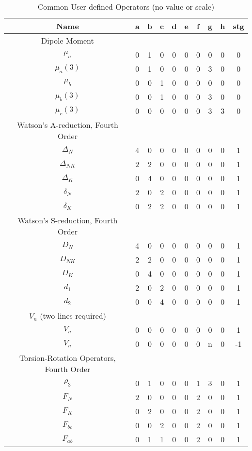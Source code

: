\documentclass{article}
\begin{document}
\begin{longtable}[ht]{c c c c c c c c c c}
	\caption{Common User-defined Operators (no value or scale)} \\
	Name & a & b & c & d & e & f & g & h & stg \\
	\hline
	Dipole Moment &&&&&&&&&\\
	$\mu_a$ & 0 & 1 & 0 & 0 & 0 & 0 & 0 & 0 & 0 \\
	$\mu_a(3)$ & 0 & 1 & 0 & 0 & 0 & 0 & 3 & 0 & 0 \\
	$\mu_b$ & 0 & 0 & 1 & 0 & 0 & 0 & 0 & 0 & 0 \\
	$\mu_b(3)$ & 0 & 0 & 1 & 0 & 0 & 0 & 3 & 0 & 0 \\
	$\mu_c(3)$ & 0 & 0 & 0 & 0 & 0 & 0 & 3 & 3 & 0 \\
	Watson's A-reduction, Fourth Order &&&&&&&&&\\
	$\Delta_N$ & 4 & 0 & 0 & 0 & 0 & 0 & 0 & 0 & 1 \\
	$\Delta_{NK}$ & 2 & 2 & 0 & 0 & 0 & 0 & 0 & 0 & 1 \\
	$\Delta_{K}$ & 0 & 4 & 0 & 0 & 0 & 0 & 0 & 0 & 1 \\
	$\delta_{N}$ & 2 & 0 & 2 & 0 & 0 & 0 & 0 & 0 & 1 \\
	$\delta_{K}$ & 0 & 2 & 2 & 0 & 0 & 0 & 0 & 0 & 1 \\
	Watson's S-reduction, Fourth Order &&&&&&&&&\\
	$D_N$ & 4 & 0 & 0 & 0 & 0 & 0 & 0 & 0 & 1 \\
	$D_{NK}$ & 2 & 2 & 0 & 0 & 0 & 0 & 0 & 0 & 1 \\
	$D_{K}$ & 0 & 4 & 0 & 0 & 0 & 0 & 0 & 0 & 1 \\
	$d_{1}$ & 2 & 0 & 2 & 0 & 0 & 0 & 0 & 0 & 1 \\
	$d_{2}$ & 0 & 0 & 4 & 0 & 0 & 0 & 0 & 0 & 1 \\
	$V_n$ (two lines required)  &&&&&&&& & \\
	$V_n$ & 0 & 0 & 0 & 0 & 0 & 0 & 0 & 0 & 1 \\
	$V_n$ & 0 & 0 & 0 & 0 & 0 & 0 & n & 0 & -1 \\
	Torsion-Rotation Operators, Fourth Order &&&&&&&&&\\
	$\rho_3$ & 0 & 1 & 0 & 0 & 0 & 1 & 3 & 0 & 1 \\
	$F_N$ & 2 & 0 & 0 & 0 & 0 & 2 & 0 & 0 & 1 \\
	$F_K$ & 0 & 2 & 0 & 0 & 0 & 2 & 0 & 0 & 1 \\
	$F_{bc}$ & 0 & 0 & 2 & 0 & 0 & 2 & 0 & 0 & 1 \\
	$F_{ab}$ & 0 & 1 & 1 & 0 & 0 & 2 & 0 & 0 & 1 \\

\end{longtable}
\end{document}
